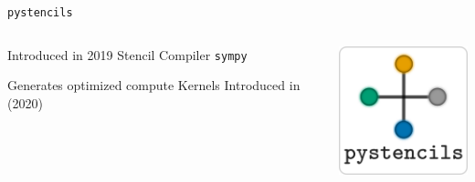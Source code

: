 \begin{frame}{\lstinline{pystencils}}
\begin{columns}
  \begin{outline}
  \1 Introduced in 2019 \cite{Bauer2019}
  \1 Stencil Compiler 
  \2 \lstinline{sympy}

  \2 Generates optimized compute Kernels
  \2 Introduced in \cite{Bauer2021} (2020)
  \end{outline}

  \centering
  \begin{center}
    \includegraphics[width=0.2\linewidth]{pystencils_logo.png}
  \end{center}
\end{columns}
\end{frame}
